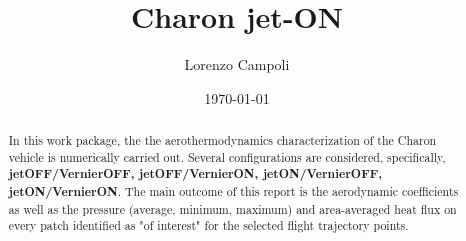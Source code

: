 \documentclass[12pt]{article}
\title{Charon jet-ON}
\author{Lorenzo Campoli}
\date{\today}
\begin{document}
%
\setmainfont{Arial}
%
\maketitle
%
\renewcommand{\arraystretch}{1.5} %
\setlength{\tabcolsep}{8pt}       %

\begin{center}
\end{center}

\begin{abstract}
\noindent In this work package, the the aerothermodynamics characterization of the Charon vehicle is numerically carried out. Several configurations are considered, specifically, \textbf{jetOFF/VernierOFF, jetOFF/VernierON, jetON/VernierOFF, jetON/VernierON}. The main outcome of this report is the aerodynamic coefficients as well as the pressure (average, minimum, maximum) and area-averaged heat flux on every patch identified as "of interest" for the selected flight trajectory points.
\end{abstract}
%
%
%
\tableofcontents
%
\end{document}

